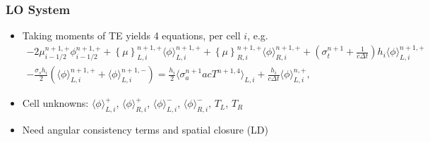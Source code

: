 \documentclass[xcolor=dvipsnames,handout,hyperref={pdfpagelabels=false}]{beamer}
\newcommand{\colb}[1]{{\color{blue} #1}}
\newlength{\wideitemsep}
\let\olditem\item
\renewcommand{\item}{\setlength{\itemsep}{\wideitemsep}\olditem}
\newcommand{\mom}[1]{\langle #1 \rangle}
\newcommand{\cur}[1]{\left\{ #1 \right\}}
\begin{document}
\begin{frame}
    \frametitle{LO System}
    \begin{itemize}
        \item Taking moments of TE yields \colb{4 equations}, per cell $i$, e.g.
\begin{multline}\label{lo_tran}
    -2{\mu}_{i-1/2}^{n+1,+} \phi_{i-1/2}^{n+1,+} + \cur {\mu}_{L,i}^{n+1,+}
  \mom{\phi}_{L,i}^{n+1,+}
  +  \cur\mu_{R,i}^{n+1,+}
  \mom{\phi}_{R,i}^{n+1,+} +  \left(\sigma_t^{n+1}+\frac{1}{c \Delta t} \right) h_i 
  \mom{\phi}_{L,i}^{n+1,+} \\-  \frac{\sigma_s h_i}{2} \left( \mom{\phi}_{L,i}^{n+1,+} +
  \mom\phi_{L,i}^{n+1,-}\right) = \frac{h_i}{2} \mom{\sigma_a^{n+1} a c T^{n+1,4}}_{L,i} +
  \frac{h_i}{c\Delta t}\mom{\phi}_{L,i}^{n,+},
\end{multline}
        \item Cell unknowns: $\mom{\phi}_{L,i}^{+}$, $\mom{\phi}_{R,i}^{+}$,
        $\mom{\phi}_{L,i}^{-}$, $\mom{\phi}_{R,i}^{-}$, $T_L$, $T_R$

    \item Need \colb{angular} consistency terms  and spatial closure
        (LD)
    \end{itemize}

\end{frame}
\end{document}
